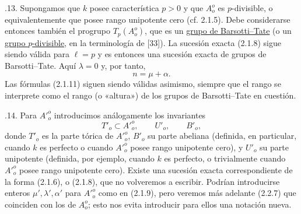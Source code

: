 \medskip
{}.13. Supongamos que $k$ posee característica $p>0$ y que $A_o^o$ es
$p$-divisible, o equivalentemente que posee rango unipotente cero
(cf. 2.1.5). Debe considerarse entonces también el progrupo
$T_p(A_o^o)$, que es un \underline{grupo de Barsotti--Tate} (o un
\underline{grupo $p$-divisible}, en la terminología de [33]). La
sucesión exacta (2.1.8) sigue siendo válida para $\ell=p$ y es entonces
una sucesión exacta de grupos de Barsotti--Tate. Aquí $\lambda=0$ y,
por tanto,
\begin{equation}\tag{2.1.13.1}
 n=\mu+\alpha.
\end{equation}
Las fórmulas (2.1.11) siguen siendo válidas asimismo, siempre que el
rango se interprete como el rango (o «altura») de los grupos de
Barsotti--Tate en cuestión.

\medskip
{}.14. Para ${A'}_o^o$ introducimos análogamente los invariantes
\[
 T'_o\subset {A'}_o^o,\qquad U'_o,\qquad B'_o,
\]
donde $T'_o$ es la parte tórica de ${A'}_o^o$, $B'_o$ su parte abeliana
(definida, en particular, cuando $k$ es perfecto o cuando ${A'}_o^o$
posee rango unipotente cero), y $U'_o$ su parte unipotente (definida,
por ejemplo, cuando $k$ es perfecto, o trivialmente cuando
${A'}_o^o$ posee rango unipotente cero). Existe una sucesión exacta
correspondiente de la forma (2.1.6), o (2.1.8), que no volveremos a
escribir. Podrían introducirse enteros $\mu',\lambda',\alpha'$ para
${A'}_o^o$ como en (2.1.9), pero veremos más adelante (2.2.7) que
coinciden con los de $A_o^o$; esto nos evita introducir para ellos una
notación nueva.
